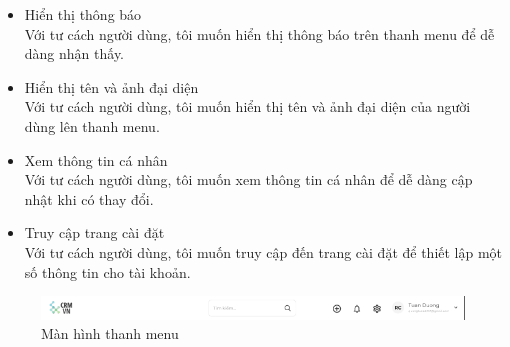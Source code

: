 \documentclass[12pt,a4paper]{article}
\begin{document}
\begin{enumerate}
\begin{itemize}
            \item Hiển thị thông báo \\
            Với tư cách người dùng, tôi muốn hiển thị thông báo trên thanh menu để dễ dàng nhận thấy.
            \item Hiển thị tên và ảnh đại diện \\
            Với tư cách người dùng, tôi muốn hiển thị tên và ảnh đại diện của người dùng lên thanh menu.
            \item Xem thông tin cá nhân \\
            Với tư cách người dùng, tôi muốn xem thông tin cá nhân để dễ dàng cập nhật khi có thay đổi.
            \item Truy cập trang cài đặt \\
            Với tư cách người dùng, tôi muốn truy cập đến trang cài đặt để thiết lập một số thông tin cho tài khoản.
        \end{itemize}
        \begin{figure}[H]
            \centering \includegraphics[width=\textwidth]{Img/Nguyet/all.png}
            \vspace{0.5cm}
            \caption{Màn hình thanh menu}
            \label{menu}
        \end{figure}



\end{enumerate}
\end{document}
